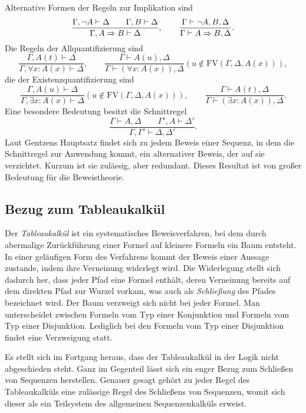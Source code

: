 Alternative Formen der Regeln zur Implikation sind
\[\dfrac{\Gamma,\lnot A\vdash\Delta\qquad\Gamma, B\vdash\Delta}
{\Gamma, A\Rightarrow B\vdash\Delta},\qquad
\dfrac{\Gamma\vdash \lnot A, B,\Delta}{\Gamma\vdash A\Rightarrow B,\Delta}.\]
Die Regeln der Allquantifizierung sind
\[\dfrac{\Gamma, A(t)\vdash\Delta}{\Gamma,\forall x\colon A(x)\vdash\Delta},\qquad
\dfrac{\Gamma\vdash A(u),\Delta}{\Gamma\vdash (\forall x\colon A(x)),\Delta}
(u\notin\mathrm{FV}(\Gamma,\Delta,A(x))),\]
die der Existenzquantifizierung sind
\[\dfrac{\Gamma, A(u)\vdash\Delta}{\Gamma,\exists x\colon A(x)\vdash\Delta}
(u\notin\mathrm{FV}(\Gamma,\Delta,A(x))),\qquad
\dfrac{\Gamma\vdash A(t),\Delta}{\Gamma\vdash (\exists x\colon A(x)),\Delta}.\]
Eine besondere Bedeutung besitzt die Schnittregel
\[\dfrac{\Gamma\vdash A,\Delta\qquad\Gamma',A\vdash\Delta'}
{\Gamma,\Gamma'\vdash\Delta,\Delta'}.\]
Laut Gentzens Hauptsatz findet sich zu jedem Beweis einer Sequenz,
in dem die Schnittregel zur Anwendung kommt, ein alternativer Beweis,
der auf sie verzichtet. Kurzum ist sie zulässig, aber redundant. Dieses
Resultat ist von großer Bedeutung für die Beweistheorie.

\subsection{Bezug zum Tableaukalkül}

Der \emph{Tableaukalkül} ist ein
systematisches Beweisverfahren, bei dem durch abermalige Zurückführung
einer Formel auf kleinere Formeln ein Baum entsteht. In einer
geläufigen Form des Verfahrens kommt der Beweis einer Aussage zustande,
indem ihre Verneinung widerlegt wird. Die Widerlegung stellt sich
dadurch her, dass jeder Pfad eine Formel enthält, deren
Verneinung bereits auf dem direkten Pfad zur Wurzel vorkam, was auch
als \emph{Schließung} des Pfades bezeichnet wird. Der Baum verzweigt
sich nicht bei jeder Formel. Man unterscheidet zwischen
Formeln vom Typ einer Konjunktion und Formeln vom Typ einer
Disjunktion. Lediglich bei den Formeln vom Typ einer Disjunktion
findet eine Verzweigung statt.

Es stellt sich im Fortgang heraus, dass der Tableaukalkül in der Logik
nicht abgeschieden steht. Ganz im Gegenteil lässt sich ein enger Bezug
zum Schließen von Sequenzen herstellen. Genauer gesagt gehört zu jeder
Regel des Tableaukalküls eine zulässige Regel des Schließens von
Sequenzen, womit sich dieser als ein Teilsystem des allgemeinen
Sequenzenkalküls erweist.

